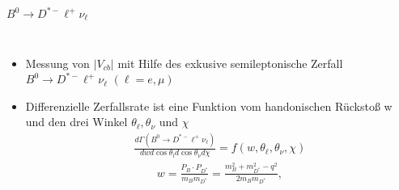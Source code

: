 \documentclass{beamer}
\begin{document}
\begin{frame}{$B^0\longrightarrow D^{*-} \ell ^+ \nu_{\ell}$}
\begin{columns}
\begin{itemize}
\item
Messung von $|V_{cb}|$ mit Hilfe des exkusive semileptonische Zerfall $B^0 \longrightarrow D^{*-}\ell^+ \nu_{\ell}$ $(\ell = e, \mu)$
\item
Differenzielle Zerfallsrate ist eine Funktion vom handonischen Rückstoß w und den drei Winkel $\theta_{\ell}, \theta_{\nu}$ und $\chi$\\
\begin{align*}
\frac{d \Gamma   (B^0\longrightarrow D^{*-} \ell ^+ \nu_{\ell})}{dw d \cos \theta_l d \cos \theta_{\nu}d \chi}= f(w, \theta_{\ell}, \theta_{\nu}, \chi)
\end{align*}
\begin{align*}
w=\frac{P_B \cdot P_{D^*}}{m_B m_{D^*}}=\frac{m_B^2+m_{D^*}^2-q^2}{2 m_B m_{D^*}},
\label{eq:recoil}
\end{align*}
\end{itemize}
\end{columns}
\end{frame}


\end{document}
